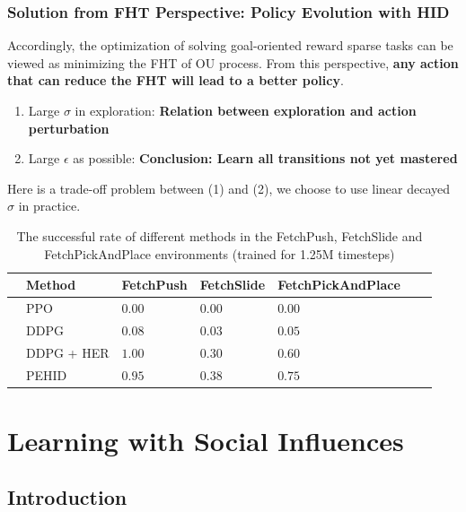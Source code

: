 \documentclass[10pt,hyperref={CJKbookmarks=true},envcountsect,mathserif]{beamer}
\begin{document}
\begin{frame}
	\frametitle{Solution from FHT Perspective: Policy Evolution with HID}
	Accordingly, the optimization of solving goal-oriented reward sparse tasks can be viewed as minimizing the FHT of OU process. From this perspective, \textbf{any action that can reduce the FHT will lead to a better policy}. 

\begin{enumerate}
	\item Large $\sigma$ in exploration: \textbf{Relation between exploration and action perturbation}
	\item Large $\epsilon$ as possible: \textbf{Conclusion: Learn all transitions not yet mastered}
\end{enumerate}

Here is a trade-off problem between (1) and (2), we choose to use linear decayed $\sigma$ in practice.

	\begin{table}[t]
	\caption{The successful rate of different methods in the FetchPush, FetchSlide and FetchPickAndPlace environments (trained for 1.25M timesteps)}
	\label{tab_successrate}
	\tiny
	\label{text-table}
	\centering
	\begin{tabular}{lllllll}
		\toprule & Method  & FetchPush & FetchSlide &FetchPickAndPlace    \\
		\midrule
		& PPO   & $0.00$  &   $ 0.00$&   $0.00$\\
		& DDPG   & $0.08$  &  $0.03$   &   $0.05$ \\
		& DDPG + HER   & $\bm{1.00}$  &  $0.30$   &   $0.60$ \\
		& PEHID   & $0.95$   &  $\bm{0.38}$ &   $\bm{0.75}$\\
		\bottomrule
	\end{tabular}

	\vspace{-12pt}
\end{table}
\end{frame}


\section{Learning with Social Influences}
\subsection{Introduction}
\end{document}
